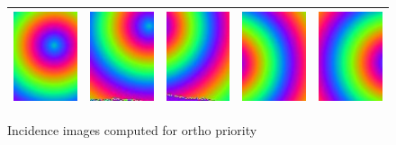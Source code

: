 \begin{figure}
\begin{tabular}{||c|c|c|c|c||}
   \hline \hline
   \includegraphics[width=30mm]{FIGS/Boudhas/Incid_IMG_5588_8Bits.jpg} &
   \includegraphics[width=30mm]{FIGS/Boudhas/Incid_IMG_5589_8Bits.jpg} &
   \includegraphics[width=30mm]{FIGS/Boudhas/Incid_IMG_5590_8Bits.jpg} &
   \includegraphics[width=30mm]{FIGS/Boudhas/Incid_IMG_5591_8Bits.jpg} &
   \includegraphics[width=30mm]{FIGS/Boudhas/Incid_IMG_5592_8Bits.jpg} \\ \hline  \hline
\end{tabular}
\label{Incid:Ortho}
\caption{ Incidence images computed for ortho priority}
\end{figure}

